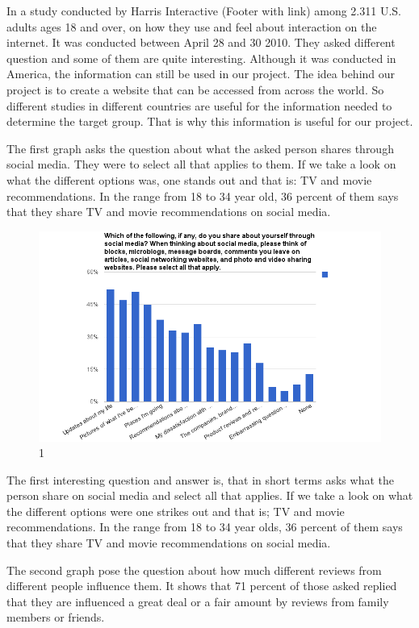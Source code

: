 In a study conducted by Harris Interactive (Footer with link) among 2.311 U.S. adults ages 18 and over, on how they use and feel about interaction on the internet. It was conducted between April 28 and 30 2010. They asked different question and some of them are quite interesting.
Although it was conducted in America, the information can still be used in our project. The idea behind our project is to create a website that can be accessed from across the world. So different studies in different countries are useful for the information needed to determine the target group. That is why this information is useful for our project.

The first graph asks the question about what the asked person shares through social media. They were to select all that applies to them. If we take a look on what the different options was, one stands out and that is: TV and movie recommendations. In the range from 18 to 34 year old, 36 percent of them says that they share TV and movie recommendations on social media.

\begin{figure}[htb]
\centering
\includegraphics[width=1\textwidth]{Images/teori1.png}
\caption{1}
\label{Teori1}
\end{figure}

The first interesting question and answer is, that in short terms asks what the person share on social media and select all that applies. If we take a look on what the different options were one strikes out and that is; TV and movie recommendations. In the range from 18 to 34 year olds, 36 percent of them says that they share TV and movie recommendations on social media.

The second graph pose the question about how much different reviews from different people influence them. It shows that 71 percent of those asked replied that they are influenced a great deal or a fair amount by reviews from family members or friends. 

